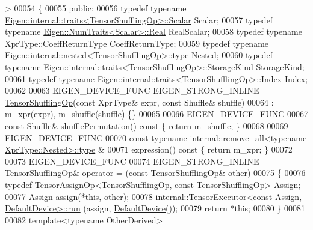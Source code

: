 \begin{DoxyCode}
      >
00054 \{
00055   \textcolor{keyword}{public}:
00056   \textcolor{keyword}{typedef} \textcolor{keyword}{typename} \hyperlink{struct_eigen_1_1internal_1_1traits}{Eigen::internal::traits<TensorShufflingOp>::Scalar}
       Scalar;
00057   \textcolor{keyword}{typedef} \textcolor{keyword}{typename} \hyperlink{group___sparse_core___module}{Eigen::NumTraits<Scalar>::Real} RealScalar;
00058   \textcolor{keyword}{typedef} \textcolor{keyword}{typename} XprType::CoeffReturnType CoeffReturnType;
00059   \textcolor{keyword}{typedef} \textcolor{keyword}{typename} \hyperlink{class_eigen_1_1internal_1_1_tensor_lazy_evaluator_writable}{Eigen::internal::nested<TensorShufflingOp>::type}
       Nested;
00060   \textcolor{keyword}{typedef} \textcolor{keyword}{typename} \hyperlink{struct_eigen_1_1internal_1_1traits}{Eigen::internal::traits<TensorShufflingOp>::StorageKind}
       StorageKind;
00061   \textcolor{keyword}{typedef} \textcolor{keyword}{typename} \hyperlink{struct_eigen_1_1internal_1_1traits}{Eigen::internal::traits<TensorShufflingOp>::Index}
       \hyperlink{namespace_eigen_a62e77e0933482dafde8fe197d9a2cfde}{Index};
00062 
00063   EIGEN\_DEVICE\_FUNC EIGEN\_STRONG\_INLINE \hyperlink{class_eigen_1_1_tensor_shuffling_op}{TensorShufflingOp}(\textcolor{keyword}{const} XprType& expr, \textcolor{keyword}{const} 
      Shuffle& shuffle)
00064       : m\_xpr(expr), m\_shuffle(shuffle) \{\}
00065 
00066     EIGEN\_DEVICE\_FUNC
00067     \textcolor{keyword}{const} Shuffle& shufflePermutation()\textcolor{keyword}{ const }\{ \textcolor{keywordflow}{return} m\_shuffle; \}
00068 
00069     EIGEN\_DEVICE\_FUNC
00070     \textcolor{keyword}{const} \textcolor{keyword}{typename} \hyperlink{group___sparse_core___module}{internal::remove\_all<typename XprType::Nested>::type}
      &
00071     expression()\textcolor{keyword}{ const }\{ \textcolor{keywordflow}{return} m\_xpr; \}
00072 
00073     EIGEN\_DEVICE\_FUNC
00074     EIGEN\_STRONG\_INLINE TensorShufflingOp& operator = (\textcolor{keyword}{const} TensorShufflingOp& other)
00075     \{
00076       \textcolor{keyword}{typedef} \hyperlink{class_eigen_1_1_tensor_assign_op}{TensorAssignOp<TensorShufflingOp, const TensorShufflingOp>}
       Assign;
00077       Assign assign(*\textcolor{keyword}{this}, other);
00078       \hyperlink{class_eigen_1_1internal_1_1_tensor_executor}{internal::TensorExecutor<const Assign, DefaultDevice>::run}
      (assign, \hyperlink{struct_eigen_1_1_default_device}{DefaultDevice}());
00079       \textcolor{keywordflow}{return} *\textcolor{keyword}{this};
00080     \}
00081 
00082     \textcolor{keyword}{template}<\textcolor{keyword}{typename} OtherDerived>

\end{DoxyCode}
